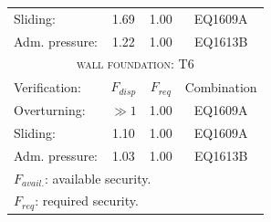 \begin{center}
\begin{tabular}{|l|c|c|c|}
Sliding:  & 1.69 & 1.00 & EQ1609A\\
Adm. pressure:  & 1.22 & 1.00 & EQ1613B\\
\hline
\multicolumn{4}{|c|}{\textsc{wall foundation: T6}}\\
\hline
Verification:  & $F_{disp}$ & $F_{req}$ & Combination\\
\hline
Overturning:  & $\gg 1$ & 1.00 & EQ1609A\\
Sliding:  & 1.10 & 1.00 & EQ1609A\\
Adm. pressure:  & 1.03 & 1.00 & EQ1613B\\
\hline
\multicolumn{4}{|l|}{$F_{avail.}$: available security.}\\
\multicolumn{4}{|l|}{$F_{req}$: required security.}\\
\hline
\end{tabular}
\end{center}
